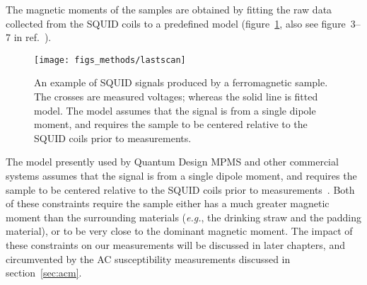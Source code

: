 The magnetic moments of the samples are obtained by fitting the raw data collected from the SQUID coils to a predefined model (figure~\ref{fig:lastscan}, also see figure~3--7 in ref.~\cite{mpms_software}). %
\begin{figure}[ht]%
	\centering%
    \texttt{[image: figs\_methods/lastscan]}%
    \caption[An example of SQUID magnetometry data]{\label{fig:lastscan}An example of SQUID signals produced by a ferromagnetic sample. The crosses are measured voltages; whereas the solid line is fitted model. The model assumes that the signal is from a single dipole moment, and requires the sample to be centered relative to the SQUID coils prior to measurements.}%
\end{figure}%
The model presently used by Quantum Design MPMS and other commercial systems assumes that the signal is from a single dipole moment, and requires the sample to be centered relative to the SQUID coils prior to measurements~\cite{mpms_software, squid_bg, squid_center_error}. Both of these constraints require the sample either has a much greater magnetic moment than the surrounding materials (\textit{e.g.}, the drinking straw and the padding material), or to be very close to the dominant magnetic moment. The impact of these constraints on our measurements will be discussed in later chapters, and circumvented by the AC susceptibility measurements discussed in section~\ref{sec:acm}.